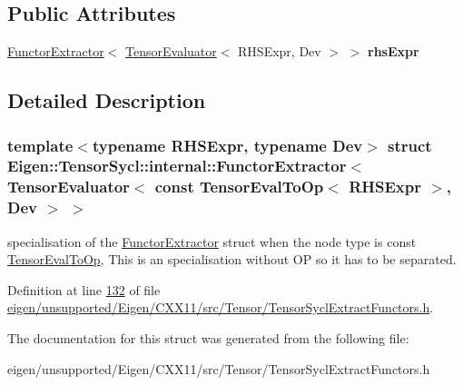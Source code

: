 \subsection*{Public Attributes}
\begin{DoxyCompactItemize}
\item 
\mbox{\label{struct_eigen_1_1_tensor_sycl_1_1internal_1_1_functor_extractor_3_01_tensor_evaluator_3_01const_00cb481c3699f8d4e5fa68dcbf0785993_ad8b5a2211fc495ba9368ebe61a4dde3f}} 
\hyperlink{struct_eigen_1_1_tensor_sycl_1_1internal_1_1_functor_extractor}{Functor\+Extractor}$<$ \hyperlink{struct_eigen_1_1_tensor_evaluator}{Tensor\+Evaluator}$<$ R\+H\+S\+Expr, Dev $>$ $>$ {\bfseries rhs\+Expr}
\end{DoxyCompactItemize}


\subsection{Detailed Description}
\subsubsection*{template$<$typename R\+H\+S\+Expr, typename Dev$>$\newline
struct Eigen\+::\+Tensor\+Sycl\+::internal\+::\+Functor\+Extractor$<$ Tensor\+Evaluator$<$ const Tensor\+Eval\+To\+Op$<$ R\+H\+S\+Expr $>$, Dev $>$ $>$}

specialisation of the \hyperlink{struct_eigen_1_1_tensor_sycl_1_1internal_1_1_functor_extractor}{Functor\+Extractor} struct when the node type is const \hyperlink{class_eigen_1_1_tensor_eval_to_op}{Tensor\+Eval\+To\+Op}, This is an specialisation without OP so it has to be separated. 

Definition at line \hyperlink{eigen_2unsupported_2_eigen_2_c_x_x11_2src_2_tensor_2_tensor_sycl_extract_functors_8h_source_l00132}{132} of file \hyperlink{eigen_2unsupported_2_eigen_2_c_x_x11_2src_2_tensor_2_tensor_sycl_extract_functors_8h_source}{eigen/unsupported/\+Eigen/\+C\+X\+X11/src/\+Tensor/\+Tensor\+Sycl\+Extract\+Functors.\+h}.



The documentation for this struct was generated from the following file\+:\begin{DoxyCompactItemize}
\item 
eigen/unsupported/\+Eigen/\+C\+X\+X11/src/\+Tensor/\+Tensor\+Sycl\+Extract\+Functors.\+h\end{DoxyCompactItemize}
